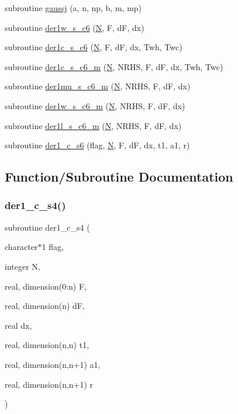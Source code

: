 \begin{DoxyCompactItemize}
subroutine \hyperlink{ders__n_8f_abf1c05125911f7af8594b57fc08173d6}{gaussj} (a, n, np, b, m, mp)
\item 
subroutine \hyperlink{ders__n_8f_a85318cd87491a83396b40821098eb08e}{der1w\+\_\+s\+\_\+c6} (\hyperlink{mc__gpu_8cu_ab2b6b0c222cd1ce70d6a831f57241e59}{N}, F, dF, dx)
\item 
subroutine \hyperlink{ders__n_8f_ad28fd0993dc50a6f7a02d4a758e77255}{der1c\+\_\+s\+\_\+c6} (\hyperlink{mc__gpu_8cu_ab2b6b0c222cd1ce70d6a831f57241e59}{N}, F, dF, dx, Twh, Twc)
\item 
subroutine \hyperlink{ders__n_8f_a491558d4ef2c9c158ffd119794a6e139}{der1c\+\_\+s\+\_\+c6\+\_\+m} (\hyperlink{mc__gpu_8cu_ab2b6b0c222cd1ce70d6a831f57241e59}{N}, N\+R\+HS, F, dF, dx, Twh, Twc)
\item 
subroutine \hyperlink{ders__n_8f_ade7d6a43f43b87a141098a663c9a944f}{der1mu\+\_\+s\+\_\+c6\+\_\+m} (\hyperlink{mc__gpu_8cu_ab2b6b0c222cd1ce70d6a831f57241e59}{N}, N\+R\+HS, F, dF, dx)
\item 
subroutine \hyperlink{ders__n_8f_a7ab82ea5067cf682f4d0dc56db0cbe81}{der1w\+\_\+s\+\_\+c6\+\_\+m} (\hyperlink{mc__gpu_8cu_ab2b6b0c222cd1ce70d6a831f57241e59}{N}, N\+R\+HS, F, dF, dx)
\item 
subroutine \hyperlink{ders__n_8f_aeb7bb2e484e12ecec556dd458b046759}{der1l\+\_\+s\+\_\+c6\+\_\+m} (\hyperlink{mc__gpu_8cu_ab2b6b0c222cd1ce70d6a831f57241e59}{N}, N\+R\+HS, F, dF, dx)
\item 
subroutine \hyperlink{ders__n_8f_a7b0700ad7724c3baa64e7112910cbf05}{der1\+\_\+c\+\_\+s6} (flag, \hyperlink{mc__gpu_8cu_ab2b6b0c222cd1ce70d6a831f57241e59}{N}, F, dF, dx, t1, a1, r)
\end{DoxyCompactItemize}


\subsection{Function/\+Subroutine Documentation}
\mbox{\label{ders__n_8f_ab061c3c65031a830ee62dd33eed2b1d0}} 
\subsubsection{\texorpdfstring{der1\+\_\+c\+\_\+s4()}{der1\_c\_s4()}}
{\footnotesize\ttfamily subroutine der1\+\_\+c\+\_\+s4 (\begin{DoxyParamCaption}\item[{character$\ast$1}]{flag,  }\item[{integer}]{N,  }\item[{real, dimension(0\+:n)}]{F,  }\item[{real, dimension(n)}]{dF,  }\item[{real}]{dx,  }\item[{real, dimension(n,n)}]{t1,  }\item[{real, dimension(n,n+1)}]{a1,  }\item[{real, dimension(n,n+1)}]{r }\end{DoxyParamCaption})}


